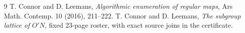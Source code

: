 \documentclass[11pt,a4paper]{article}
\begin{document}
\begin{thebibliography}{9}
 T. Connor and D. Leemans, \emph{Algorithmic enumeration
of regular maps}, Ars Math. Contemp. 10 (2016), 211--222.
 T. Connor and D. Leemans, \emph{The subgroup lattice
of $O'N$}, fixed 23-page roster, with exact source joins in the certificate.
\end{thebibliography}
\end{document}
